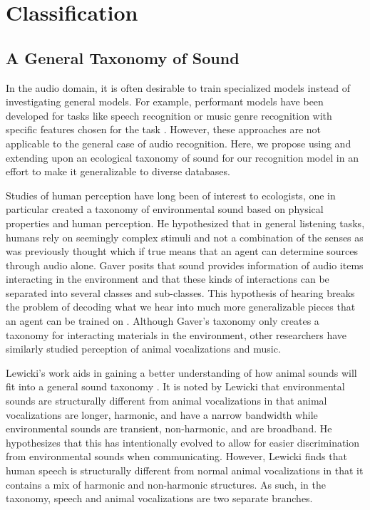 \section{Classification}

\subsection{A General Taxonomy of Sound}

In the audio domain, it is often desirable to train specialized models instead
of investigating general models. For example, performant models have been
developed for tasks like speech recognition or music genre recognition with
specific features chosen for the task \cite{Campbell1997,
tzanetakis-musical-2002}. However, these approaches are not applicable to the
general case of audio recognition. Here, we propose using and extending upon an
ecological taxonomy of sound for our recognition model in an effort to make it
generalizable to diverse databases.

Studies of human perception have long been of interest to ecologists, one in
particular created a taxonomy of environmental sound based on physical
properties and human perception. He hypothesized that in general listening
tasks, humans rely on seemingly complex stimuli and not a combination of the
senses as was previously thought which if true means that an agent can determine
sources through audio alone. Gaver posits that sound provides information of
audio items interacting in the environment and that these kinds of interactions
can be separated into several classes and sub-classes. This hypothesis of
hearing breaks the problem of decoding what we hear into much more generalizable
pieces that an agent can be trained on \cite{Gaver1993}. Although Gaver's
taxonomy only creates a taxonomy for interacting materials in the environment,
other researchers have similarly studied perception of animal vocalizations and
music.

Lewicki's work aids in gaining a better understanding of how animal sounds will
fit into a general sound taxonomy \cite{lewicki-efficient-2002}. It is noted by
Lewicki that environmental sounds are structurally different from animal
vocalizations in that animal vocalizations are longer, harmonic, and have a
narrow bandwidth while environmental sounds are transient, non-harmonic, and are
broadband. He hypothesizes that this has intentionally evolved to allow for
easier discrimination from environmental sounds when communicating. However,
Lewicki finds that human speech is structurally different from normal animal
vocalizations in that it contains a mix of harmonic and non-harmonic structures.
As such, in the taxonomy, speech and animal vocalizations are two separate
branches.

